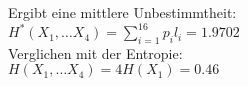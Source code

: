 \begin{uebsp}
\begin{Answer}
Ergibt eine mittlere Unbestimmtheit: \\
$H^*(X_1, \dots X_4) = \sum_{i=1}^{16} p_i l_i = 1.9702$\\

Verglichen mit der Entropie:\\
$H(X_1, \dots X_4) = 4 H(X_1) = 0.46$

\end{Answer}
\end{uebsp}

